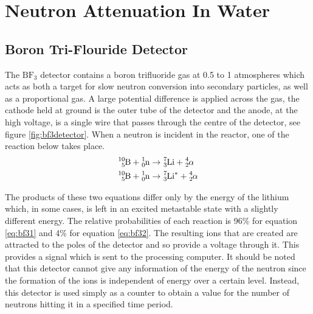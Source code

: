 \section{Neutron Attenuation In Water} %
\label{sec:neutron_attenuation_in_water}


\subsection{Boron Tri-Flouride Detector} %
\label{ssub:boron_tri_flouride_detector}
The $\text{BF}_3$ detector contains a boron trifluoride gas at 0.5 to 1 atmospheres which acts as both a target for slow neutron conversion into secondary particles, as well as a proportional gas. A large potential difference is applied across the gas, the cathode held at ground is the outer tube of the detector and the anode, at the high voltage, is a single wire that passes through the centre of the detector, see figure \ref{fig:bf3detector}. When a neutron is incident in the reactor, one of the reaction below takes place.
\begin{align}
	\cf{^{10}_{5}B} + \cf{^{1}_{0}n} &\rightarrow \cf{^{7}_{3}Li} + \cf{^{4}_{2}\alpha} \label{eq:bf31}\\
	\cf{^{10}_{5}B} + \cf{^{1}_{0}n} &\rightarrow \cf{^{7}_{3}Li^*} + \cf{^{4}_{2}\alpha} \label{eq:bf32}
\end{align} 

The products of these two equations differ only by the energy of the lithium which, in some cases, is left in an excited metastable state with a slightly different energy. The relative probabilities of each reaction is 96\% for equation \ref{eq:bf31} and 4\% for equation \ref{eq:bf32}. The resulting ions that are created are attracted to the poles of the detector and so provide a voltage through it. This provides a signal which is sent to the processing computer. It should be noted that this detector cannot give any information of the energy of the neutron since the formation of the ions is independent of energy over a certain level. Instead, this detector is used simply as a counter to obtain a value for the number of neutrons hitting it in a specified time period. 

